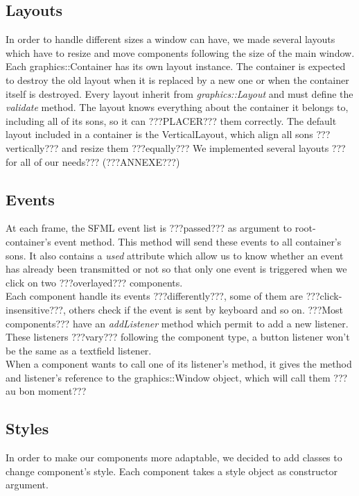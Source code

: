 \documentclass{scrreprt}
\begin{document}
						  \subsection{Layouts}
						  In order to handle different sizes a window can have, we made several layouts which have to resize and move components following the size of the main window. Each graphics::Container has its own layout instance. The container is expected to destroy the old layout when it is replaced by a new one or when the container itself is destroyed. Every layout inherit from \emph{graphics::Layout} and must define the \emph{validate} method. 
						  The layout knows everything about the container it belongs to, including all of its sons, so it can ???PLACER??? them correctly.
	The default layout included in a container is the VerticalLayout, which align all sons ???vertically??? and resize them ???equally???
We implemented several layouts ???for all of our needs??? (???ANNEXE???)

	\subsection{Events}
	At each frame, the SFML event list is ???passed??? as argument to root-container's event method. This method will send these events to all container's sons. It also contains a \emph{used} attribute which allow us to know whether an event has already been transmitted or not so that only one event is triggered when we click on two ???overlayed??? components.\\

	Each component handle its events ???differently???, some of them are ???click-insensitive???, others check if the event is sent by keyboard and so on.
	???Most components??? have an \emph{addListener} method which permit to add a new listener. These listeners ???vary??? following the component type, a button listener won't be the same as a textfield listener.\\

	When a component wants to call one of its listener's method, it gives the method and listener's reference to the graphics::Window object, which will call them ???au bon moment???

	\subsection{Styles}
	In order to make our components more adaptable, we decided to add classes to change component's style. Each component takes a style object as constructor argument. 
\end{document}
